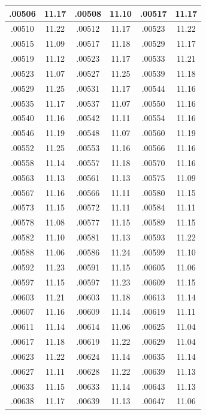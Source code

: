 \documentclass[10pt,twoside]{report}
\begin{document}
\begin{appendices}
\begin{longtable}{|c|c||c|c||c|c|}
.00506 & 11.17 & .00508 & 11.10 & .00517 & 11.17\\\hline
.00510 & 11.22 & .00512 & 11.17 & .00523 & 11.22\\\hline
.00515 & 11.09 & .00517 & 11.18 & .00529 & 11.17\\\hline
.00519 & 11.12 & .00523 & 11.17 & .00533 & 11.21\\\hline
.00523 & 11.07 & .00527 & 11.25 & .00539 & 11.18\\\hline
.00529 & 11.25 & .00531 & 11.17 & .00544 & 11.16\\\hline
.00535 & 11.17 & .00537 & 11.07 & .00550 & 11.16\\\hline
.00540 & 11.16 & .00542 & 11.11 & .00554 & 11.16\\\hline
.00546 & 11.19 & .00548 & 11.07 & .00560 & 11.19\\\hline
.00552 & 11.25 & .00553 & 11.16 & .00566 & 11.16\\\hline
.00558 & 11.14 & .00557 & 11.18 & .00570 & 11.16\\\hline
.00563 & 11.13 & .00561 & 11.13 & .00575 & 11.09\\\hline
.00567 & 11.16 & .00566 & 11.11 & .00580 & 11.15\\\hline
.00573 & 11.15 & .00572 & 11.11 & .00584 & 11.11\\\hline
.00578 & 11.08 & .00577 & 11.15 & .00589 & 11.15\\\hline
.00582 & 11.10 & .00581 & 11.13 & .00593 & 11.22\\\hline
.00588 & 11.06 & .00586 & 11.24 & .00599 & 11.10\\\hline
.00592 & 11.23 & .00591 & 11.15 & .00605 & 11.06\\\hline
.00597 & 11.15 & .00597 & 11.23 & .00609 & 11.15\\\hline
.00603 & 11.21 & .00603 & 11.18 & .00613 & 11.14\\\hline
.00607 & 11.16 & .00609 & 11.14 & .00619 & 11.11\\\hline
.00611 & 11.14 & .00614 & 11.06 & .00625 & 11.04\\\hline
.00617 & 11.18 & .00619 & 11.22 & .00629 & 11.04\\\hline
.00623 & 11.22 & .00624 & 11.14 & .00635 & 11.14\\\hline
.00627 & 11.11 & .00628 & 11.22 & .00639 & 11.13\\\hline
.00633 & 11.15 & .00633 & 11.14 & .00643 & 11.13\\\hline
.00638 & 11.17 & .00639 & 11.13 & .00647 & 11.06\\\hline

\end{longtable}
\end{appendices}
\end{document}
